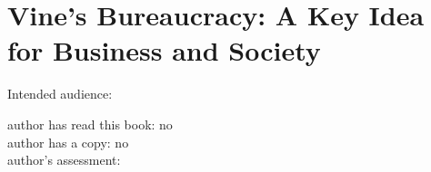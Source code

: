 \section{Vine's Bureaucracy: A Key Idea for Business and Society\label{review:vine_key}}

\cite{2020_Vine}

Intended audience:

author has read this book: no\\
author has a copy: no\\
author's assessment:
